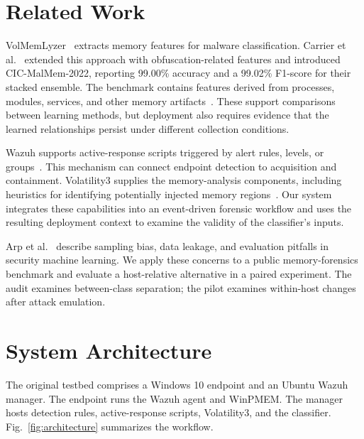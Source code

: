 \documentclass[conference]{IEEEtran}
\begin{document}
\section{Related Work}

VolMemLyzer~\cite{lashkari2021} extracts memory features for malware
classification. Carrier et al.~\cite{carrier2022} extended this approach with
obfuscation-related features and introduced CIC-MalMem-2022, reporting 99.00\%
accuracy and a 99.02\% F1-score for their stacked ensemble. The benchmark
contains features derived from processes, modules, services, and other memory
artifacts~\cite{carrier2022}. These support comparisons between learning methods,
but deployment also requires evidence that the learned relationships persist
under different collection conditions.

Wazuh supports active-response scripts triggered by alert rules, levels, or
groups~\cite{wazuh}. This mechanism can connect endpoint detection to
acquisition and containment. Volatility3 supplies the memory-analysis
components, including heuristics for identifying potentially injected memory
regions~\cite{volatility3}. Our system integrates these capabilities into an
event-driven forensic workflow and uses the resulting deployment context to
examine the validity of the classifier's inputs.

Arp et al.~\cite{arp2022} describe sampling bias, data leakage, and evaluation
pitfalls in security machine learning. We apply these concerns to a public
memory-forensics benchmark and evaluate a host-relative alternative in a
paired experiment. The audit examines between-class separation; the pilot
examines within-host changes after attack emulation.

\section{System Architecture}
\label{sec:architecture}

The original testbed comprises a Windows 10 endpoint and an Ubuntu Wazuh manager.
The endpoint runs the Wazuh agent and WinPMEM. The manager hosts detection
rules, active-response scripts, Volatility3, and the classifier.
Fig.~\ref{fig:architecture} summarizes the workflow.
\end{document}
